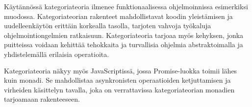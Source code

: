 Käytännössä kategoriateoria ilmenee funktionaalisessa ohjelmoinnissa esimerkiksi  muodossa. Kategoriateorian rakenteet mahdollistavat koodin yleistämisen ja uudelleenkäytön erittäin korkealla tasolla, tarjoten vahvoja työkaluja ohjelmointiongelmien ratkaisuun. Kategoriateoria tarjoaa myös kehyksen, jonka puitteissa voidaan kehittää tehokkaita ja turvallisia ohjelmia abstraktoimalla ja yhdistelemällä erilaisia operatioita. \cite{bartosz_category_for_progamers,promises-spec-94,category_theory}

Kategoriateoria näkyy myös JavaScriptissä, jossa Promise-luokka toimii lähes kuin monadi. Se mahdollistaa asynkronisten operaatioiden ketjuttamisen ja virheiden käsittelyn tavalla, joka on verrattavissa kategoriateorian monadien tarjoamaan rakenteeseen. \cite{promises-spec-94}









